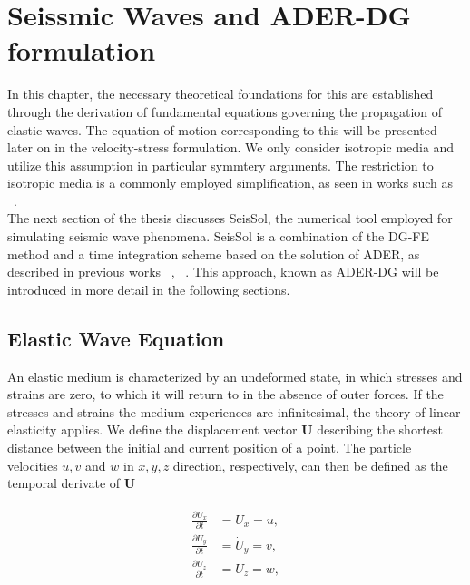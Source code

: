 
\chapter{Seissmic Waves and ADER-DG formulation}\label{chapter:seismicwaves}
In this chapter, the necessary theoretical foundations for this are established through the derivation of fundamental equations governing the propagation of elastic waves.
The equation of motion corresponding to this will be presented later on in the velocity-stress formulation.
We only consider isotropic media and utilize this assumption in particular symmtery arguments. The restriction to isotropic media is a commonly employed simplification, as seen in works such as ~\parencite{dumbser1}. \\

The next section of the thesis discusses SeisSol, the numerical tool employed for simulating seismic wave phenomena. SeisSol is a combination
of the \ac{DG-FE} method and a time integration scheme based on the solution of \ac{ADER}, as described in previous works ~\parencite{dumbser1}, ~\parencite{seissol}. This approach, known as 
\ac{ADER}-\ac{DG} will be introduced in more detail in the following sections.

\section{Elastic Wave Equation}\label{section:elasticwaveequation}
An elastic medium is characterized by an undeformed state, in which stresses and strains are zero, to which it will return to in the absence
of outer forces. If the stresses and strains the medium experiences are infinitesimal, the theory of linear elasticity applies. We define
the displacement vector $\mathbf{U}$ describing the shortest distance between the initial and current position of a point. The particle
velocities $u,v$ and $w$ in $x, y, z$ direction, respectively, can then be defined as the temporal derivate of $\mathbf{U}$

\begin{align}
    \begin{split}
    \frac{\partial U_x}{\partial t} &= \dot{U}_x = u, \\
    \frac{\partial U_y}{\partial t} &= \dot{U}_y = v, \\
    \frac{\partial U_z}{\partial t} &= \dot{U}_z = w, \\
    \end{split}
 \end{align}

